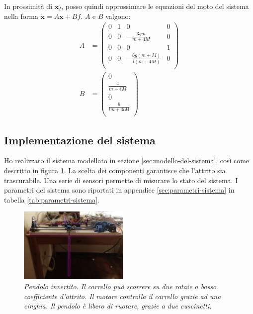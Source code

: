 In prossimità di $\mathbf x_I$, posso quindi approssimare le equazioni del moto del sistema nella forma
$\dot {\mathbf x} = A\mathbf x + B f$. $A$ e $B$ valgono:
\begin{equation}
  \begin{aligned}
    A &=
    \left(\begin{array}{cccc}0&1&0&0\\0&0&-\frac{3gm}{m+4M}&0\\0&0&0&1\\0&0&-\frac{6g(m+M)}{l(m+4M)}&0\\\end{array}\right)
    \\
    B &=
    \left(\begin{array}{c}0\\\frac{4}{m+4M}\\0\\\frac{6}{lm+4lM}\\\end{array}\right)
    \label{eq:A-e-B}
    \end{aligned}
\end{equation}

\subsection{Implementazione del sistema}\label{subsec:implementazione-del-sistema}
Ho realizzato il sistema modellato in sezione \ref{sec:modello-del-sistema}, così come descritto in figura \ref{fig:foto}.
La scelta dei componenti garantisce che l'attrito sia trascurabile.
Una serie di sensori permette di misurare lo stato del sistema.
I parametri del sistema sono riportati in appendice \ref{sec:parametri-sistema} in tabella \ref{tab:parametri-sistema}.

\begin{figure}[h]
  \includegraphics[width=0.47\textwidth]{../assets/pend-down.jpg}
  \caption{\emph{Pendolo invertito. Il carrello può scorrere su due rotaie a basso coefficiente d'attrito. Il motore
  controlla il carrello grazie ad una cinghia. Il pendolo è libero di ruotare, grazie a due cuscinetti.}}
  \label{fig:foto}
\end{figure}
